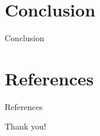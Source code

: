 \documentclass[]{beamer} %
\begin{document}
\section{Conclusion}

\begin{frame}{Conclusion}
\end{frame}

\section{References}

\begin{frame}[allowframebreaks]{References}
\printbibliography
\end{frame}

\begin{titleframe}
	\begin{center}
	\alert{\Large Thank you!}
	\end{center}
\end{titleframe}
\end{document}
